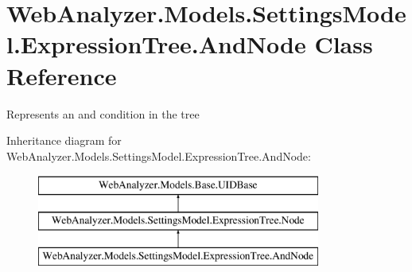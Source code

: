 \hypertarget{class_web_analyzer_1_1_models_1_1_settings_model_1_1_expression_tree_1_1_and_node}{}\section{Web\+Analyzer.\+Models.\+Settings\+Model.\+Expression\+Tree.\+And\+Node Class Reference}
\label{class_web_analyzer_1_1_models_1_1_settings_model_1_1_expression_tree_1_1_and_node}


Represents an and condition in the tree  


Inheritance diagram for Web\+Analyzer.\+Models.\+Settings\+Model.\+Expression\+Tree.\+And\+Node\+:\begin{figure}[H]
\begin{center}
\leavevmode
\includegraphics[height=3.000000cm]{class_web_analyzer_1_1_models_1_1_settings_model_1_1_expression_tree_1_1_and_node}
\end{center}
\end{figure}
